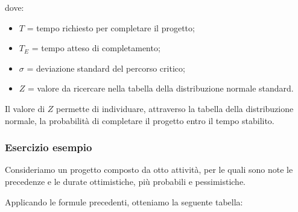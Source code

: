 \noindent dove:

\begin{itemize}
    \item $T$ = tempo richiesto per completare il progetto;
    \item $T_E$ = tempo atteso di completamento;
    \item $\sigma$ = deviazione standard del percorso critico;
    \item $Z$ = valore da ricercare nella tabella della
    distribuzione normale standard.
\end{itemize}

\noindent Il valore di $Z$ permette di individuare,
attraverso la tabella della distribuzione normale,
la probabilità di completare il progetto entro il tempo
stabilito.


\subsubsection*{Esercizio esempio}

\noindent Consideriamo un progetto composto da otto attività,
per le quali sono note le precedenze e le durate
ottimistiche, più probabili e pessimistiche.

\medskip

\noindent Applicando le formule precedenti, otteniamo
la seguente tabella:

\begin{center}
\end{center}


